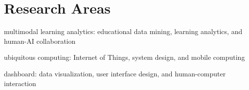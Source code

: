 \documentclass[11pt,letterpaper]{report}
\newcommand{\listitemspace}{0.25em}
\renewenvironment{itemize}
{\begin{list}{}{\setlength{\leftmargin}{0em}
                \setlength{\parskip}{0em}
                \setlength{\itemsep}{\listitemspace}
                \setlength{\parsep}{\listitemspace}}}
{\end{list}}
\begin{document}
%
%
%
%
%
%



    \section*{Research Areas}

    \begin{itemize}

        \item multimodal learning analytics: educational data mining, learning analytics, and human-AI collaboration
        \item ubiquitous computing: Internet of Things, system design, and mobile computing
        \item dashboard: data visualization, user interface design, and human-computer interaction

    \end{itemize}
\end{document}
